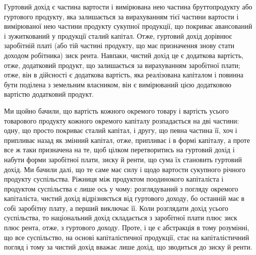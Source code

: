 
Гуртовий дохід є частина вартости і вимірювана нею частина брутто\dash{}продукту
або гуртового продукту, яка залишається за вирахуванням тієї частини
вартости і вимірюваної нею частини продукту сукупної продукції, що покриває
авансований і зужиткований у продукції сталий капітал. Отже, гуртовий дохід
дорівнює заробітній платі (або тій частині продукту, що має призначення знову
стати доходом робітника) \dplus{} зиск \dplus{} рента. Навпаки, чистий дохід це є додаткова
вартість, отже, додатковий продукт, що залишається за вирахуванням заробітної
плати; отже, він в дійсності є додаткова вартість, яка реалізована капіталом і
повинна бути поділена з земельним власником, він є вимірюваний цією додатковою
вартістю додатковий продукт.

Ми щойно бачили, що вартість кожного окремого товару і вартість усього
товарового продукту кожного окремого капіталу розпадається на дві частини:
одну, що просто покриває сталий капітал, і другу, що певна частина її, хоч і
припливає назад як змінний капітал, отже, припливає і в формі капіталу,
а проте все ж таки призначена на те, щоб цілком перетворитись на гуртовий
дохід і набути форми заробітної плати, зиску й ренти, що сума їх становить
гуртовий дохід. Ми бачили далі, що те саме має силу і щодо вартости сукупного
річного продукту суспільства. Ріжниця між продуктом поодинокого капіталіста
і продуктом суспільства є лише ось у чому: розглядуваний з погляду
окремого капіталіста, чистий дохід відрізняється від гуртового доходу, бо останній
має в собі заробітну плату, а перший виключає її. Коли розглядати дохід
усього суспільства, то національний дохід складається з заробітної плати плюс
зиск плюс рента, отже, з гуртового доходу. Проте, і це є абстракція в тому
розумінні, що все суспільство, на основі капіталістичної продукції, стає на капіталістичний
погляд і тому за чистий дохід вважає лише дохід, що зводиться
до зиску й ренти.

